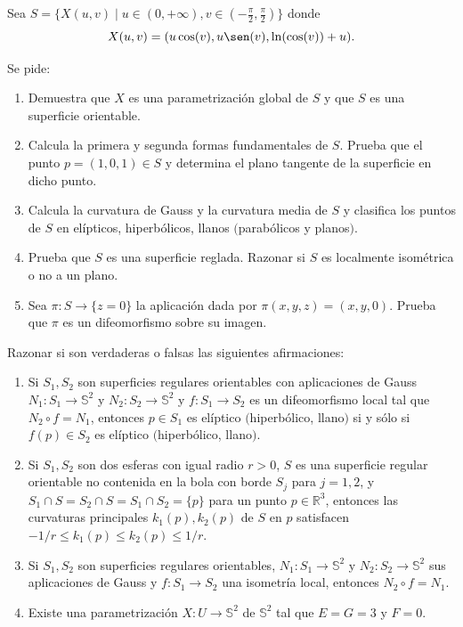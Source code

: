 \documentclass[12pt]{article}
\begin{document}
    \begin{ejercicio}
    Sea $S=\{X(u,v)\mid u\in (0,+\infty), v\in (-\frac{\pi}{2},\frac{\pi}{2})\}$ donde
    $$
    X(u,v)=(u\cos(v),u\sen(v),\ln(\cos(v))+u).
    $$

    Se pide:
    \begin{enumerate}
        \item[a)] Demuestra que $X$ es una parametrización global de $S$ y que $S$ es una superficie orientable.

        \item[b)] Calcula la primera y segunda formas fundamentales de $S$. Prueba que el punto $p=(1,0,1)\in S$ y determina el plano tangente de la superficie en dicho punto.

        \item[c)] Calcula la curvatura de Gauss y la curvatura media de $S$ y clasifica los puntos de $S$ en elípticos, hiperbólicos, llanos $($parabólicos y planos$)$.

        \item[d)] Prueba que $S$ es una superficie reglada. Razonar si $S$ es localmente isométrica o no a un plano.

        \item[e)] Sea $\pi:S\to \{z=0\}$ la aplicación dada por $\pi(x,y,z)=(x,y,0)$. Prueba que $\pi$ es un difeomorfismo sobre su imagen.
    \end{enumerate}
    \end{ejercicio}

    \begin{ejercicio}
    Razonar si son verdaderas o falsas las siguientes afirmaciones:

    \begin{enumerate}
        \item[a)] Si $S_1,S_2$ son superficies regulares orientables con aplicaciones de Gauss $N_1:S_1\to \mathbb{S}^2$ y $N_2:S_2\to \mathbb{S}^2$ y $f:S_1\to S_2$ es un difeomorfismo local tal que $N_2\circ f=N_1$, entonces $p\in S_1$ es elíptico $($hiperbólico, llano$)$ si y sólo si $f(p)\in S_2$ es elíptico $($hiperbólico, llano$)$.

        \item[b)] Si $S_1,S_2$ son dos esferas con igual radio $r>0$, $S$ es una superficie regular orientable no contenida en la bola con borde $S_j$ para $j=1,2$, y $S_1\cap S=S_2\cap S=S_1\cap S_2=\{p\}$ para un punto $p\in \mathbb{R}^3$, entonces las curvaturas principales $k_1(p),k_2(p)$ de $S$ en $p$ satisfacen $-1/r\leq k_1(p)\leq k_2(p)\leq 1/r$.

        \item[c)] Si $S_1,S_2$ son superficies regulares orientables, $N_1:S_1\to \mathbb{S}^2$ y $N_2:S_2\to \mathbb{S}^2$ sus aplicaciones de Gauss y $f:S_1\to S_2$ una isometría local, entonces $N_2\circ f=N_1$.

        \item[d)] Existe una parametrización $X:U\to \mathbb{S}^2$ de $\mathbb{S}^2$ tal que $E=G=3$ y $F=0$.
    \end{enumerate}
    \end{ejercicio}
\end{document}
